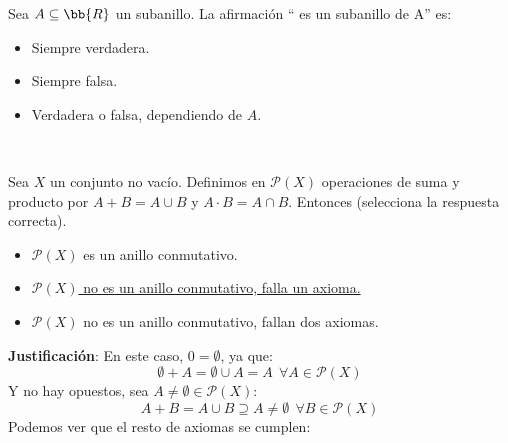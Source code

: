 \begin{ejercicio}
    Sea $A \subseteq \bb{R}$ un subanillo. La afirmación `` es un subanillo de A'' es:
    \begin{itemize}
        \item Siempre verdadera.
        \item Siempre falsa.
        \item Verdadera o falsa, dependiendo de $A$.
    \end{itemize}
\end{ejercicio}

\newpage
\ %
\resetearcontador

\begin{ejercicio}
    Sea $X$ un conjunto no vacío. Definimos en $\mathcal{P}(X)$ operaciones de suma y producto por $A+B = A \cup B$ y $A \cdot B = A \cap B$. Entonces (selecciona la respuesta correcta).
    \begin{itemize}
        \item $\mathcal{P}(X)$ es un anillo conmutativo.
        \item \underline{$\mathcal{P}(X)$ no es un anillo conmutativo, falla un axioma.}
        \item $\mathcal{P}(X)$ no es un anillo conmutativo, fallan dos axiomas.
    \end{itemize}

    \noindent
    \textbf{Justificación}:
    En este caso, $0 = \emptyset$, ya que:
    $$\emptyset + A = \emptyset \cup A = A~~\forall A \in \mathcal{P}(X)$$
    Y no hay opuestos, sea $A\neq \emptyset \in \mathcal{P}(X)$:
    $$A + B = A \cup B \supseteq A \neq \emptyset~~\forall B \in \mathcal{P}(X)$$
    Podemos ver que el resto de axiomas se cumplen:
    

\end{ejercicio}
